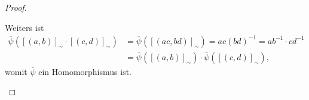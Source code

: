 \begin{proof} {\ }
\begin{enumerate}
        Weiters ist
        \begin{align*}
            \overline{\psi}([(a,b)]_\sim \cdot [(c,d)]_\sim) &= \overline{\psi}([(ac,bd)]_\sim) = ac (bd)^{-1} = ab^{-1} \cdot cd^{-1} \\ &= \overline{\psi}([(a,b)]_\sim) \cdot \overline{\psi}([(c,d)]_\sim), 
        \end{align*}
        womit $\overline{\psi}$ ein Homomorphismus ist.
    \end{enumerate}
\end{proof}